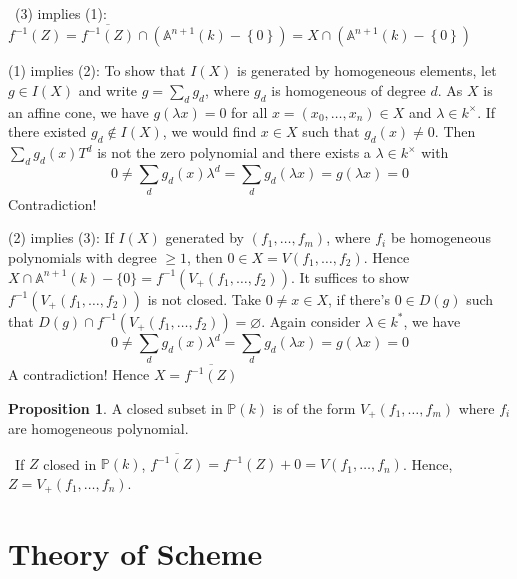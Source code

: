 \documentclass[12pt,a4paper]{book}
\newenvironment{prooff}{{\noindent\it\textcolor{cyan!40!black}{Proof}:}\,}{\par}
\newcommand{\bbrace}[1]{\left\{ #1 \right\} }
\newcommand{\bb}[1]{\mathbb{#1}}
\theoremstyle{definition}
\newtheorem{prop}[defn]{Proposition}
\begin{document}
\begin{prooff}
    (3) implies (1): $f^{-1}(Z)=\overline{f^{-1}(Z)}\cap(\mathbb{A}^{n+1}(k)-\bbrace{0})=X\cap (\mathbb{A}^{n+1}(k)-\bbrace{0})$
    
    (1) implies (2): To show that $I(X)$ is generated by homogeneous elements, let $g \in I(X)$ and write $g=\sum_d g_d$, where $g_d$ is homogeneous of degree $d$. As $X$ is an affine cone, we have $g(\lambda x)=0$ for all $x=\left(x_0, \ldots, x_n\right) \in X$ and $\lambda \in k^{\times}$. If there existed $g_d \notin I(X)$, we would find $x \in X$ such that $g_d(x) \neq 0$. Then $\sum_d g_d(x) T^d$ is not the zero polynomial and 
    there exists a $\lambda \in k^{\times}$ with
    $$
    0 \neq \sum_d g_d(x) \lambda^d=\sum_d g_d(\lambda x)=g(\lambda x)=0
    $$
    Contradiction!

    (2) implies (3): If $I(X)$ generated by $(f_1,\dots,f_m)$, where $f_i$ be homogeneous polynomials with degree $\ge 1$, 
    then $0\in X=V(f_1,\dots,f_2)$. Hence $X\cap \mathbb{A}^{n+1}(k)-\{0\}=f^{-1}(V_{+}(f_1,\dots,f_2))$. It suffices to show $f^{-1}(V_{+}(f_1,\dots,f_2))$
    is not closed. Take $0\neq x\in X$, if there's $0\in D(g)$ such that $D(g)\cap f^{-1}(V_{+}(f_1,\dots,f_2))=\varnothing$.
    Again consider $\lambda\in k^*$, we have 
    $$
    0 \neq \sum_d g_d(x) \lambda^d=\sum_d g_d(\lambda x)=g(\lambda x)=0
    $$
    A contradiction! Hence $X=\overline{f^{-1}(Z)}$
\end{prooff}
\begin{prop}
    A closed subset in $\bb{P}(k)$ is of the form $V_{+}(f_1,\dots,f_m)$ where $f_i$ are homogeneous polynomial.
\end{prop}
\begin{prooff}
    If $Z$ closed in $\bb{P}(k)$, $\overline{f^{-1}(Z)}=f^{-1}(Z)+0 =V(f_1,\dots,f_n)$. Hence, $Z=V_{+}(f_1,\dots,f_n)$. 

\end{prooff}




\chapter{Theory of Scheme}
\end{document}
